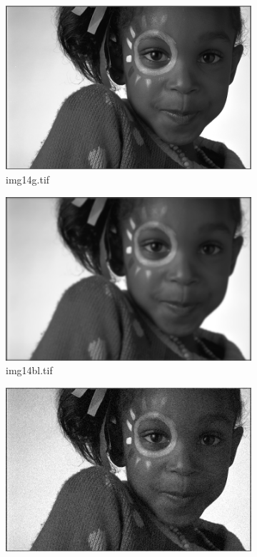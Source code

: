 \documentclass{article}
\begin{document}
	\begin{figure}[h]
		\begin{subfigure}{0.5\textwidth}
			\includegraphics[width=1.0\textwidth]{img14g.png}
			\caption{img14g.tif}
		\end{subfigure}
		\begin{subfigure}{0.5\textwidth}
			\includegraphics[width=1.0\textwidth]{img14bl.png}
			\caption{img14bl.tif}
		\end{subfigure}
		\begin{subfigure}{0.5\textwidth}
			\includegraphics[width=1.0\textwidth]{img14gn.png}

\end{subfigure}
\end{figure}
\end{document}

